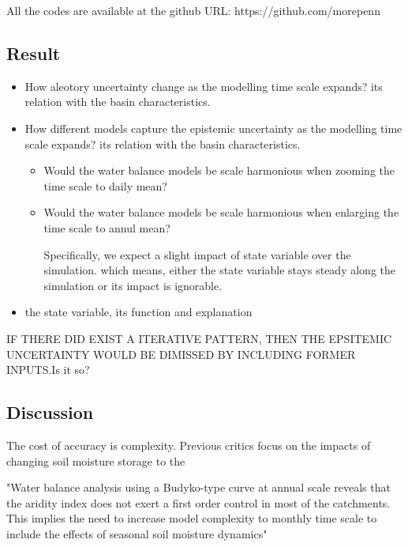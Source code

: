 All the codes are available at the github URL: https://github.com/morepenn

\newpage
\begin{center}
\section{Result}
\end{center}
\begin{itemize}
\item How aleotory uncertainty change as the modelling time scale expands? its relation with the basin characteristics.
\item How different models capture the epistemic uncertainty as the modelling time scale expands? its relation with the basin characteristics.
\begin{itemize}
\item Would the water balance models be scale harmonious when zooming  the time scale to daily mean?
\item Would the water balance models be scale harmonious when enlarging the time scale to annul mean?

Specifically, we expect a slight impact of state variable over the simulation. which means, either the state variable stays steady along the simulation or its impact is ignorable.
\end{itemize}
\item the state variable, its function and explanation
\end{itemize}

IF THERE DID EXIST A ITERATIVE PATTERN, THEN THE EPSITEMIC UNCERTAINTY WOULD BE DIMISSED BY INCLUDING FORMER INPUTS.Is it so?

\newpage
\begin{center}
\section{Discussion}
\end{center}

The cost of accuracy is complexity.
Previous critics focus on the 
impacts of changing soil moisture storage to the 
  
"Water balance analysis using a Budyko-type curve at annual scale reveals that the aridity index does not exert a first order control in most of the catchments. This implies the need to increase model complexity to monthly time scale to include the effects of seasonal soil moisture dynamics" 


